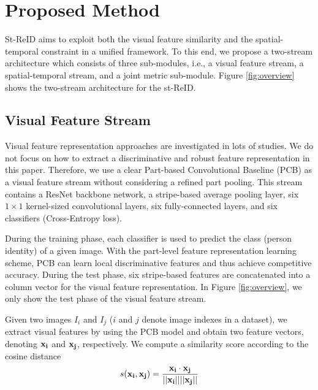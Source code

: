 \documentclass[letterpaper]{article} %
\begin{document}
\section{Proposed Method}
\label{sec:met}
St-ReID aims to exploit both the visual feature similarity and the spatial-temporal constraint in a unified framework. To this end, we propose a two-stream architecture which consists of three sub-modules, i.e., a visual feature stream, a spatial-temporal stream, and a joint metric sub-module. Figure \ref{fig:overview} shows the two-stream architecture for the st-ReID.

\subsection{Visual Feature Stream}
Visual feature representation approaches are investigated in lots of studies. We do not focus on how to extract a discriminative and robust feature representation in this paper. Therefore, we use a clear Part-based Convolutional Baseline (PCB) \cite{Yifan2017arxiv} as a visual feature stream without considering a refined part pooling. This stream contains a ResNet backbone network, a stripe-based average pooling layer, six $1\times 1$ kernel-sized convolutional layers, six fully-connected layers, and six classifiers (Cross-Entropy loss).

During the training phase, each classifier is used to predict the class (person identity) of a given image. With the part-level feature representation learning scheme, PCB can learn local discriminative features and thus achieve competitive accuracy. During the test phase, six stripe-based features are concatenated into a column vector for the visual feature representation. In Figure \ref{fig:overview}, we only show the test phase of the visual feature stream.

Given two images $I_i$ and $I_j$ ($i$ and $j$ denote image indexes in a dataset), we extract visual features by using the PCB model and obtain two feature vectors, denoting $\bf{x_i}$ and $\bf{x_j}$, respectively. We compute a similarity score according to the cosine distance
\begin{equation}
    \label{eq:cosine}
    s({\bf{x_i}},{\bf{x_j}}) = \frac{{{\bf{x_i}} \cdot {\bf{x_j}}}}{{||{\bf{x_i}}||||{\bf{x_j}}{\rm{||}}}}
\end{equation}
\end{document}
